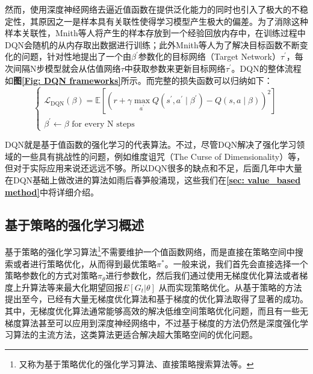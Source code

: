 然而，使用深度神经网络去逼近值函数在提供泛化能力的同时也引入了极大的不稳定性，其原因之一是样本具有关联性使得学习模型产生极大的偏差。为了消除这种样本关联性，Mnith等人将产生的样本存放到一个经验回放内存中，在训练过程中DQN会随机的从内存取出数据进行训练；此外Mnith等人为了解决目标函数不断变化的问题，针对性地提出了一个由$\beta^{\prime}$参数化的目标网络（Target Network）$\tau^{\prime}$，每次间隔N步模型就会从估值网络$\tau$中获取参数来更新目标网络$\tau^{\prime}$。DQN的整体流程如\textbf{图\ref{Fig: DQN frameworks}}所示。而完整的损失函数可以归纳如下：
\begin{equation}
    \left\{\begin{array}{l}
\mathcal{L}_{\mathrm{DQN}}(\beta)=\mathbb{E}\left[\left(r+\gamma \max _{a^{\prime}} Q\left(s^{\prime}, a^{\prime} \mid \beta^{\prime}\right)-Q(s, a \mid \beta)\right)^{2}\right] \\
\beta^{\prime} \longleftarrow \beta \text { for every } \mathrm{N} \text { steps }
\end{array}\right.
\end{equation}

DQN就是基于值函数的强化学习的代表算法。不过，尽管DQN解决了强化学习领域的一些具有挑战性的问题，例如维度诅咒（The Curse of Dimensionality）等，但对于实际应用来说还远远不够。所以DQN很多的缺点和不足，后面几年中大量在DQN基础上做改进的算法如雨后春笋般涌现，这些我们在\textbf{\ref{sec: value_based method}}中将详细介绍。 

\subsection{基于策略的强化学习概述}
\label{Sec: policy_based_method_intro}

基于策略的强化学习算法\footnote{又称为基于策略优化的强化学习算法、直接策略搜索算法等。}不需要维护一个值函数网络，而是直接在策略空间中搜索或者进行策略优化，从而得到最优策略$\pi^{*}$。一般来说，我们首先会直接选择一个策略参数化的方式对策略$\pi_{\theta}$进行参数化，然后我们通过使用无梯度优化算法或者梯度上升算法等来最大化期望回报$E[G_t|\theta]$ 从而实现策略优化。从基于策略的方法提出至今，已经有大量无梯度优化算法和基于梯度的优化算法取得了显著的成功。其中，无梯度优化算法通常能够高效的解决低维空间策略优化问题，而且有一些无梯度算法甚至可以应用到深度神经网络中，不过基于梯度的方法仍然是深度强化学习算法的主流方法，这类算法更适合解决超大策略空间的优化问题。

